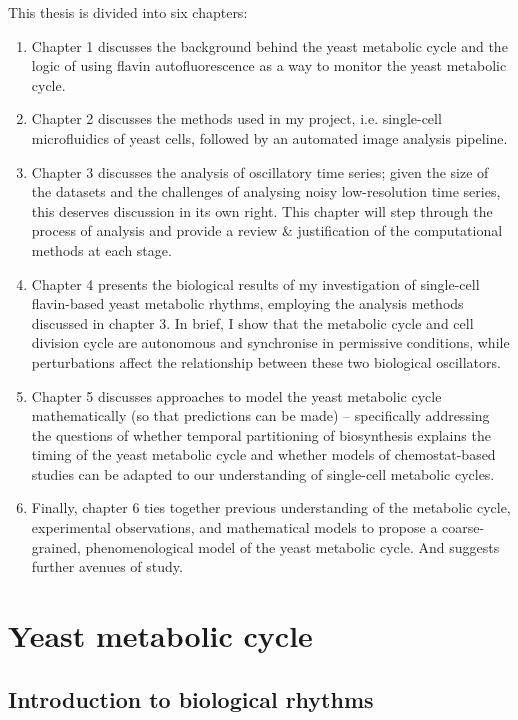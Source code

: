 This thesis is divided into six chapters:
\begin{enumerate}
  \item Chapter 1 discusses the background behind the yeast metabolic cycle and the logic of using flavin autofluorescence as a way to monitor the yeast metabolic cycle.
  \item Chapter 2 discusses the methods used in my project, i.e. single-cell microfluidics of yeast cells, followed by an automated image analysis pipeline.
  \item Chapter 3 discusses the analysis of oscillatory time series; given the size of the datasets and the challenges of analysing noisy low-resolution time series, this deserves discussion in its own right.
  This chapter will step through the process of analysis and provide a review \& justification of the computational methods at each stage.
  \item Chapter 4 presents the biological results of my investigation of single-cell flavin-based yeast metabolic rhythms, employing the analysis methods discussed in chapter 3.
  In brief, I show that the metabolic cycle and cell division cycle are autonomous and synchronise in permissive conditions, while perturbations affect the relationship between these two biological oscillators.
  \item Chapter 5 discusses approaches to model the yeast metabolic cycle mathematically (so that predictions can be made) -- specifically addressing the questions of whether temporal partitioning of biosynthesis explains the timing of the yeast metabolic cycle and whether models of chemostat-based studies can be adapted to our understanding of single-cell metabolic cycles.
  \item Finally, chapter 6 ties together previous understanding of the metabolic cycle, experimental observations, and mathematical models to propose a coarse-grained, phenomenological model of the yeast metabolic cycle.
  And suggests further avenues of study.
\end{enumerate}


\section{Yeast metabolic cycle}
\label{sec:intro-ymc}

\subsection{Introduction to biological rhythms}
\label{subsec:intro-ymc-biological_rhythms}

